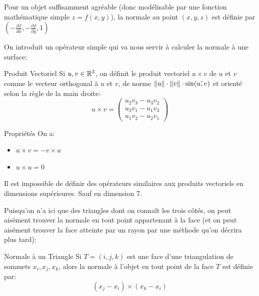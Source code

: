 \documentclass{classe}
\begin{document}
\begin{remarque}{}{}
	Pour un objet suffisamment agréable (donc modélisable par une fonction mathématique simple $z = f(x, y)$), la normale au point $(x, y, z)$ est définie par $(-\frac{\partial{f}}{\partial{x}}, -\frac{\partial{f}}{\partial{y}}, 1)$
\end{remarque}

On introduit un opérateur simple qui va nous servir à calculer la normale à une surface:
\begin{définition}{Produit Vectoriel}{}
	Si $u, v \in \mathbb{R}^{3}$, on définit le produit vectoriel $u \times v$ de $u$ et $v$ comme le vecteur orthogonal à $u$ et $v$, de norme $\left\lVert u \right\rVert\cdot\left\lVert v \right\rVert\cdot\sin(\hat{u, v})$ et orienté selon la règle de la main droite:
	\begin{equation*}
		u \times v = \begin{pmatrix}
			u_{2}v_{3} - u_{3}v_{2}\\
			u_{3}v_{1} - u_{1}v_{3}\\
			u_{1}v_{2} - u_{2}v_{1}
		\end{pmatrix}
	\end{equation*}
\end{définition}
\begin{propositionfr}{Propriétés}{}
	On a:
	\begin{itemize}
		\item $u\times v = -v\times u$
		\item $u\times u = 0$
	\end{itemize}
\end{propositionfr}

\begin{remarque}{}{}
	Il est impossible de définir des opérateurs similaires aux produits vectoriels en dimensions supérieures. Sauf en dimension 7.
\end{remarque}

Puisqu'on n'a ici que des triangles dont on connaît les trois côtés, on peut aisément trouver la normale en tout point appartenant à la face (et on peut aisément trouver la face atteinte par un rayon par une méthode qu'on décrira plus tard):
\begin{propositionfr}{Normale à un Triangle}{}
	Si $T = (i, j, k)$ est une face d'une triangulation de sommets $x_{i}, x_{j}, x_{k}$, alors la normale à l'objet en tout point de la face $T$ est définie par:
	\begin{equation*}
		(x_{j} - x_{i}) \times (x_{k} - x_{i})
	\end{equation*}
\end{propositionfr}
\end{document}
